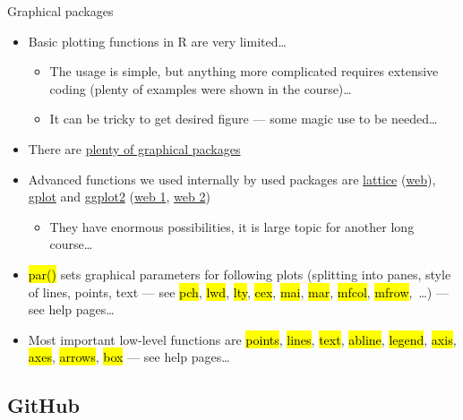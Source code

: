 \documentclass[compress, ucs, xelatex, 11pt, xcolor=svgnames,
  hyperref={
    bookmarks=true,
    unicode=true,
    colorlinks=true,
    pdftitle={Molecular data in R},
    plainpages=false,
    pdfauthor={Vojtech Zeisek},
    pdfsubject={Course about phylogeny and evolution in R},
    pdfcreator={XeLaTeX},
    pdfkeywords={R, evolution, phylogeny, molecular data},
    linkcolor=Tomato,
    anchorcolor=SaddleBrown,
    citecolor=Goldenrod,
    filecolor=DarkMagenta,
    menucolor=Sienna,
    urlcolor=DarkTurquoise,
    pdftex},
  url={hyphens, lowtilde} %
  ]{beamer}
\renewcommand{\texttt}[1]{\hl{\ttfamily #1}}
\begin{document}
\begin{frame}{Graphical packages}
  \begin{itemize}
    \item Basic plotting functions in R are very limited\ldots
    \begin{itemize}
      \item The usage is simple, but anything more complicated requires extensive coding (plenty of examples were shown in the course)\ldots
      \item It can be tricky to get desired figure --- some magic use to be needed\ldots
    \end{itemize}
    \item There are \href{https://cran.r-project.org/web/views/Graphics.html}{plenty of graphical packages}
    \item Advanced functions we used internally by used packages are \href{https://CRAN.R-project.org/package=lattice}{lattice} (\href{http://lattice.r-forge.r-project.org/}{web}), \href{https://CRAN.R-project.org/package=gplots}{gplot} and \href{https://CRAN.R-project.org/package=ggplot2}{ggplot2} (\href{http://ggplot2.org/}{web 1}, \href{http://ggplot2.tidyverse.org/}{web 2})
    \begin{itemize}
      \item They have enormous possibilities, it is large topic for another long course\ldots
    \end{itemize}
    \item \texttt{par()} sets graphical parameters for following plots (splitting into panes, style of lines, points, text --- see \texttt{pch}, \texttt{lwd}, \texttt{lty}, \texttt{cex}, \texttt{mai}, \texttt{mar}, \texttt{mfcol}, \texttt{mfrow},~\ldots) --- see help pages\ldots
    \item Most important low-level functions are \texttt{points}, \texttt{lines}, \texttt{text}, \texttt{abline}, \texttt{legend}, \texttt{axis}, \texttt{axes}, \texttt{arrows}, \texttt{box} --- see help pages\ldots
  \end{itemize}
\end{frame}

\subsection{GitHub}
\end{document}

